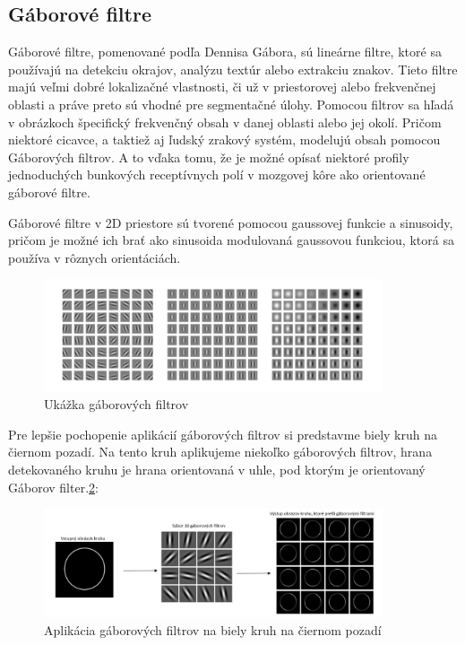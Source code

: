\subsection{Gáborové filtre} \label{gaborfilter}

\hspace{10mm}Gáborové filtre, pomenované podľa Dennisa Gábora, sú lineárne filtre, ktoré sa používajú na detekciu okrajov, analýzu textúr alebo extrakciu znakov. Tieto filtre majú veľmi dobré lokalizačné vlastnosti, či už v priestorovej alebo frekvenčnej oblasti a práve preto sú vhodné pre segmentačné úlohy. Pomocou filtrov sa hľadá v obrázkoch špecifický frekvenčný obsah v danej oblasti alebo jej okolí. Pričom niektoré cicavce, a taktiež aj ľudský zrakový systém, modelujú obsah pomocou Gáborových filtrov. A to vďaka tomu, že je možné opísať niektoré profily jednoduchých bunkových receptívnych polí v mozgovej kôre ako orientované gáborové filtre.

\hspace{10mm}Gáborové filtre v 2D priestore sú tvorené pomocou gaussovej funkcie a sinusoidy, pričom je možné ich brať ako sinusoida modulovaná gaussovou funkciou, ktorá sa používa v rôznych orientáciách.\cite{Goodfellow-et-al-2016, DBLP:journals/corr/abs-1904-13204}


\begin{figure}[h]
\begin{centering}
\includegraphics[width=10cm]{assets/images/224_1.JPG}
\par\end{centering}
\caption{Ukážka gáborových filtrov \label{fig:dynabook}\cite{Goodfellow-et-al-2016}}
\end{figure}

\hspace{10mm}Pre lepšie pochopenie aplikácií gáborových filtrov si predstavme biely kruh na čiernom pozadí. Na tento kruh aplikujeme niekoľko gáborových filtrov, hrana detekovaného kruhu je hrana orientovaná v uhle, pod ktorým je orientovaný Gáborov filter.\ref{fig:gab_filter}:


\begin{figure}[h]
\begin{centering}
\includegraphics[width=10cm]{assets/images/224_2.JPG}
\par\end{centering}
\caption{Aplikácia gáborových filtrov na biely kruh na čiernom pozadí \label{fig:gab_filter}\cite{Through-The-Eyes-of-Gabor-Filter}}
\end{figure}

